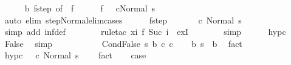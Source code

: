 \begin{isabellebody}
\ \ \ \ \isamarkupfalse%
\ b\ f{\isacharunderscore}step\ {\isacharbrackleft}of\ {}{\isacharbrackright}\ f{\isacharunderscore}{}\isanewline
\ \ \ \ \isamarkupfalse%
\ {\isachardoublequoteopen}f\ {}\ {\isacharequal}\ {\isacharparenleft}c{}{\isacharcomma}Normal\ s{\isacharparenright}{\isachardoublequoteclose}\isanewline
\ \ \ \ \ \ \isamarkupfalse%
\ {\isacharparenleft}auto\ elim{\isacharcolon}\ step{\isacharunderscore}Normal{\isacharunderscore}elim{\isacharunderscore}cases{\isacharparenright}\isanewline
\ \ \ \ \isamarkupfalse%
\ f{\isacharunderscore}step\isanewline
\ \ \ \ \isamarkupfalse%
\ {\isachardoublequoteopen}{\isasymGamma}{\isasymturnstile}\ {\isacharparenleft}c{}{\isacharcomma}\ Normal\ s{\isacharparenright}\ {\isasymrightarrow}\ {\isasymdots}{\isacharparenleft}{\isasyminfinity}{\isacharparenright}{\isachardoublequoteclose}\isanewline
\ \ \ \ \ \ \isamarkupfalse%
\ {\isacharparenleft}simp\ add{\isacharcolon}\ inf{\isacharunderscore}def{\isacharparenright}\isanewline
\ \ \ \ \ \ \isamarkupfalse%
\ {\isacharparenleft}rule{\isacharunderscore}tac\ x{\isacharequal}{\isachardoublequoteopen}{\isasymlambda}i{\isachardot}\ f\ {\isacharparenleft}Suc\ i{\isacharparenright}{\isachardoublequoteclose}\ \ exI{\isacharparenright}\isanewline
\ \ \ \ \ \ \isamarkupfalse%
\ simp\isanewline
\ \ \ \ \isamarkupfalse%
\ hyp{\isacharunderscore}c{}\ \isamarkupfalse%
\ False\ \isamarkupfalse%
\ simp\isanewline
\ \ \isamarkupfalse%
\ \ \ \ \isanewline
{}\isamarkupfalse%
\isanewline
\ \ \isamarkupfalse%
\ {\isacharparenleft}CondFalse\ s\ b\ c{}\ c{}{\isacharparenright}\isanewline
\ \ \isamarkupfalse%
\ b{\isacharcolon}\ {\isachardoublequoteopen}s\ {\isasymnotin}\ b{\isachardoublequoteclose}\ \isamarkupfalse%
\ fact\isanewline
\ \ \isamarkupfalse%
\ hyp{\isacharunderscore}c{}{\isacharcolon}\ {\isachardoublequoteopen}{\isasymnot}\ {\isasymGamma}{\isasymturnstile}\ {\isacharparenleft}c{}{\isacharcomma}\ Normal\ s{\isacharparenright}\ {\isasymrightarrow}\ {\isasymdots}{\isacharparenleft}{\isasyminfinity}{\isacharparenright}{\isachardoublequoteclose}\ \isamarkupfalse%
\ fact\isanewline
\ \ \isamarkupfalse%
\ {\isacharquery}case\isanewline
\ \ \isamarkupfalse%

\end{isabellebody}
